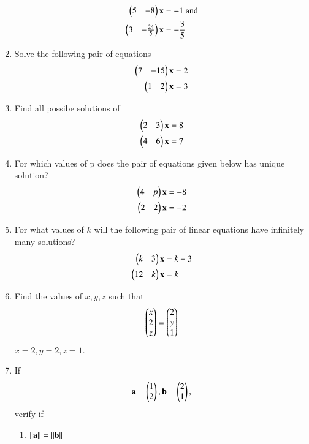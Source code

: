 \begin{enumerate}[label=\arabic*.,ref=\thesubsection.\theenumi]
\begin{align}
\begin{pmatrix}5 & -8\end{pmatrix}\mathbf{x}  &= -1 \text{ and}
\\
\begin{pmatrix} 3 & -\frac{24}{5}\end{pmatrix}\mathbf{x} &= -\frac{3}{5}
\end{align}
%
%
\item Solve the following pair of equations
%
\begin{align}
\begin{pmatrix}7 & -15\end{pmatrix}\mathbf{x}  &= 2 
\\
\begin{pmatrix} 1 & 2\end{pmatrix}\mathbf{x} &= 3
\end{align}
%
%
\item Find all possibe solutions of
\begin{align}
\begin{split}
\begin{pmatrix}2 & 3 \end{pmatrix}\mathbf{x}&=8
\\
\begin{pmatrix}4 & 6 \end{pmatrix}\mathbf{x}&=7
\end{split}
\end{align}
\item For which values of p does the pair of equations given below has unique solution?
\begin{align}
\begin{split}
\begin{pmatrix}4 & p \end{pmatrix}\mathbf{x}&=-8
\\
\begin{pmatrix}2 & 2 \end{pmatrix}\mathbf{x}&=-2
\end{split}
\end{align}
%
\item For what values of $k$ will the following pair of linear equations have infinitely many solutions?
%
\begin{align}
\begin{split}
\begin{pmatrix}k & 3 \end{pmatrix}\mathbf{x}&=k-3
\\
\begin{pmatrix}12 & k \end{pmatrix}\mathbf{x}&=k
\end{split}
\end{align}
%

\item Find the values of $x, y, z$ such that 
\begin{align}
\begin{pmatrix}x\\2\\z\end{pmatrix}= \begin{pmatrix}2\\y\\1\end{pmatrix}
\end{align}
%
\solution $x = 2, y=2, z=1$.
%
\item If
\begin{align}
\mathbf{a} = \begin{pmatrix}1\\2\end{pmatrix}, \mathbf{b} = \begin{pmatrix}2\\1\end{pmatrix},
\end{align}
verify if  
\begin{enumerate}
\item $\left\lVert\mathbf{a}\right\rVert=\left\lVert\mathbf{b}\right\rVert$


\end{enumerate}
\end{enumerate}
